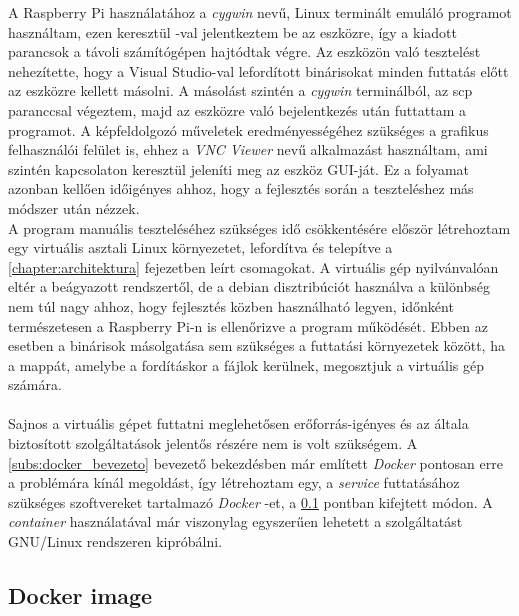 A Raspberry Pi használatához a \emph{cygwin} nevű, Linux terminált emuláló programot használtam, ezen keresztül -val jelentkeztem be az eszközre, így a kiadott parancsok a távoli számítógépen hajtódtak végre. Az eszközön való tesztelést nehezítette, hogy a Visual Studio-val lefordított binárisokat minden futtatás előtt az eszközre kellett másolni. A másolást szintén a \emph{cygwin} terminálból, az scp paranccsal végeztem, majd az eszközre való bejelentkezés után futtattam a programot. A képfeldolgozó műveletek eredményességéhez szükséges a grafikus felhasználói felület is, ehhez a \emph{VNC Viewer} nevű alkalmazást használtam, ami szintén  kapcsolaton keresztül jeleníti meg az eszköz GUI-ját. Ez a folyamat azonban  kellően időigényes ahhoz, hogy a fejlesztés során a teszteléshez más módszer után nézzek. \\
A program manuális teszteléséhez szükséges idő csökkentésére először létrehoztam egy virtuális asztali Linux környezetet, lefordítva és telepítve a \ref{chapter:architektura} fejezetben leírt csomagokat. A virtuális gép nyilvánvalóan eltér a beágyazott rendszertől, de a debian disztribúciót használva a különbség nem túl nagy ahhoz, hogy fejlesztés közben használható legyen, időnként természetesen a Raspberry Pi-n is ellenőrizve a program működését. Ebben az esetben a binárisok másolgatása sem szükséges a futtatási környezetek között, ha a mappát, amelybe a fordításkor a fájlok kerülnek, megosztjuk a virtuális gép számára.\\
\\
Sajnos a virtuális gépet futtatni meglehetősen erőforrás-igényes és az általa biztosított szolgáltatások jelentős részére nem is volt szükségem. A \ref{subs:docker_bevezeto} bevezető bekezdésben már említett \emph{Docker} pontosan erre a problémára kínál megoldást, így létrehoztam egy, a \emph{service} futtatásához szükséges szoftvereket tartalmazó \emph{Docker} -et, a \ref{subs:docker} pontban kifejtett módon. A \emph{container} használatával már viszonylag egyszerűen lehetett a szolgáltatást GNU/Linux rendszeren kipróbálni.

\subsection{Docker image} \label{subs:docker}

